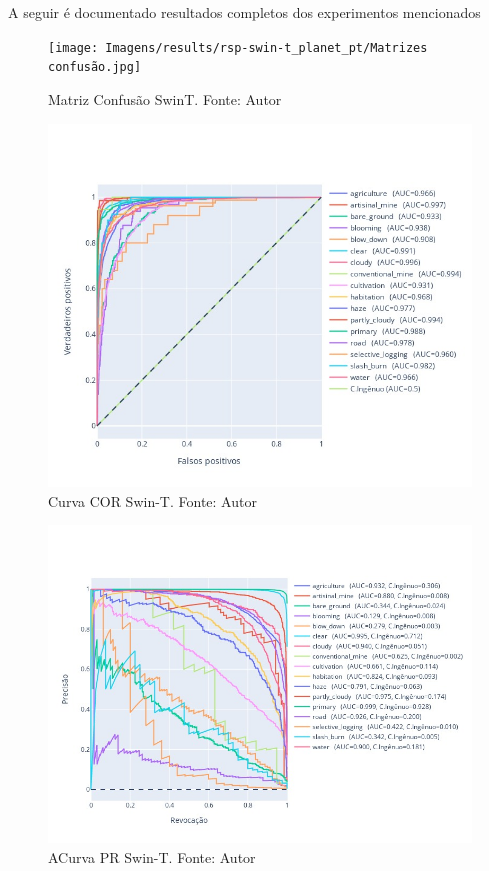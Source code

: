 A seguir é documentado resultados completos dos experimentos mencionados

\begin{figure}[!ht]
    \centering
    \texttt{[image: Imagens/results/rsp-swin-t\_planet\_pt/Matrizes confusão.jpg]}
    \caption{ Matriz Confusão SwinT. Fonte: Autor}
    \label{fig:Matriz Confusao SwinT}
\end{figure}  


\begin{figure}[!ht]
    \centering
    \includegraphics[width=\columnwidth]{Imagens/results/rsp-swin-t_planet_pt/Curva COR por classe.jpg}
    \caption{ Curva COR Swin-T.
    Fonte: Autor}
    \label{fig:AnexosCurvaCORTodasSwin}
\end{figure}    

\begin{figure}[!ht]
    \centering
    \includegraphics[width=\columnwidth]{Imagens/results/rsp-swin-t_planet_pt/Curva PR por classe.jpg}
    \caption{ ACurva PR Swin-T.
    Fonte: Autor}
    \label{fig:AnexosCurvaPRTodasSwin}
\end{figure}  




